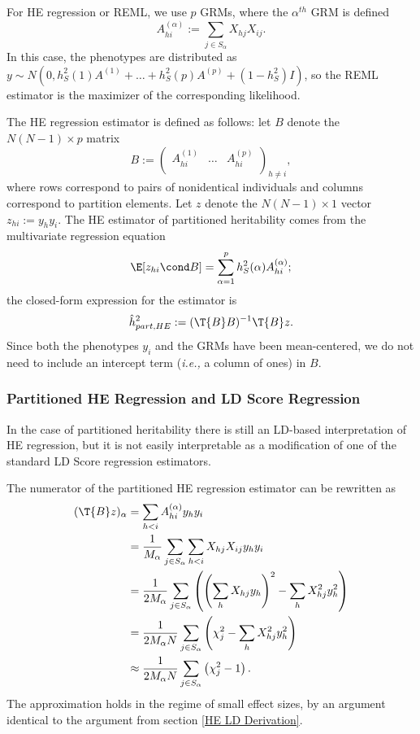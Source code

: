 For HE regression or REML, we use $p$ GRMs, where the $\alpha^{th}$ GRM is defined
\begin{equation}
	A_{hi}^{(\alpha)} := \sum_{j\in S_\alpha} X_{hj}X_{ij}.
\end{equation}
In this case, the phenotypes are distributed as $y\sim N(0, h^2_S(1)A^{(1)}+\ldots+h^2_S(p)A^{(p)} +(1-h^2_S)I )$,
so the REML estimator is the maximizer of the corresponding likelihood.

The HE regression estimator is defined as follows:
let $B$ denote the $N(N-1)\times p$ matrix
\begin{equation}
B := \left( \begin{array}{ccc}
		A^{(1)}_{hi} & \ldots &  A^{(p)}_{hi} 	\\		
	\end{array} \right)_{h\neq i},
\end{equation}
where rows correspond to pairs of nonidentical individuals and columns correspond to partition elements.
Let $z$ denote the $N(N-1)\times1$ vector $z_{hi} := y_hy_i$.
The HE estimator of partitioned heritability comes from the multivariate regression equation
\begin{equation}
	\E[z_{hi}\cond B] = \sum_{\alpha=1}^p h^2_S(\alpha)A^{(\alpha)}_{hi};
\end{equation}
the closed-form expression for the estimator is
\begin{equation}
	\hat{h}^2_{part,HE} := (\T{B}B)^{-1}\T{B}z.
\end{equation}
Since both the phenotypes $y_i$ and the GRMs have been mean-centered, we do not need to include an intercept term 
(\emph{i.e.,} a column of ones) in $B$.


\subsubsection{Partitioned HE Regression and LD Score Regression}

In the case of partitioned heritability there is still an LD-based interpretation of HE regression, 
but it is not easily interpretable as a modification of one of the standard LD Score regression estimators. 

The numerator of the partitioned HE regression estimator can be rewritten as
\begin{align}
	(\T{B}z)_\alpha 
&=
	\sum_{h<i} A^{(\alpha)}_{hi}y_hy_i\nonumber\\
&=
	\dfrac{1}{M_\alpha} \sum_{j\in S_\alpha} \sum_{h<i} X_{hj}X_{ij}y_hy_i\nonumber\\
&=
	\dfrac{1}{2M_\alpha} \sum_{j\in S_\alpha}\left( \left(\sum_{h} X_{hj}y_h\right)^2 - \sum_h X_{hj}^2y_h^2\right)\nonumber\\
&=
	\dfrac{1}{2M_\alpha N} \sum_{j\in S_\alpha} \left(\chi^2_j - \sum_h X_{hj}^2y_h^2\right)\nonumber\\
&\approx
	\dfrac{1}{2M_\alpha N} \sum_{j\in S_\alpha} \left(\chi^2_j - 1 \right).
\end{align}
The approximation holds in the regime of small effect sizes, by an argument identical to the argument from section 
\ref{HE LD Derivation}.

